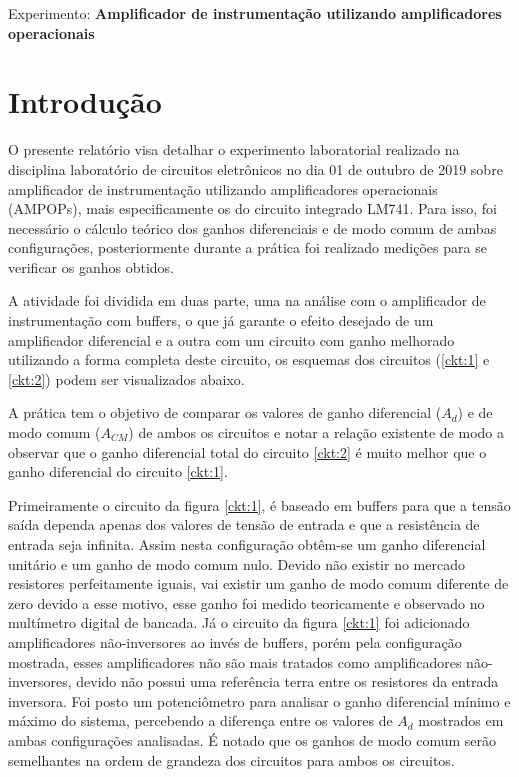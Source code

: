 \begin{center}
\large Experimento: \textbf{Amplificador de instrumentação utilizando amplificadores operacionais}
\end{center}

\setlength{\abovedisplayskip}{-10pt}
\setlength{\belowdisplayskip}{-10pt}

\section{Introdução}


O presente relatório visa detalhar o experimento laboratorial realizado na disciplina laboratório de circuitos eletrônicos no dia 01 de outubro de 2019 sobre amplificador de instrumentação utilizando amplificadores operacionais (AMPOPs), mais especificamente os do circuito integrado LM741. Para isso, foi necessário o cálculo teórico dos ganhos diferenciais e de modo comum de ambas configurações, posteriormente durante a prática foi realizado medições para se verificar os ganhos obtidos.

A atividade foi dividida em duas parte, uma na análise com o amplificador de instrumentação com buffers, o que já garante o efeito desejado de um amplificador diferencial e a outra com um circuito com ganho melhorado utilizando a forma completa deste circuito, os esquemas dos circuitos (\ref{ckt:1} e \ref{ckt:2}) podem ser visualizados abaixo.





A prática tem o objetivo de comparar os valores de ganho diferencial ($A_d$) e de modo comum ($A_{CM}$) de ambos os circuitos e notar a relação existente de modo a observar que o ganho diferencial total do circuito \ref{ckt:2} é muito melhor que o ganho diferencial do circuito \ref{ckt:1}.

Primeiramente o circuito da figura \ref{ckt:1}, é baseado em buffers para que a tensão saída dependa apenas dos valores de tensão de entrada e que a resistência de entrada seja infinita. Assim nesta configuração obtêm-se um ganho diferencial unitário e um ganho de modo comum nulo. Devido não existir no mercado resistores perfeitamente iguais, vai existir um ganho de modo comum diferente de zero devido a esse motivo, esse ganho foi medido teoricamente e observado no multímetro digital de bancada. Já o circuito da figura \ref{ckt:1} foi adicionado amplificadores não-inversores ao invés de buffers, porém pela configuração mostrada, esses amplificadores não são mais tratados como amplificadores não-inversores, devido não possui uma referência terra entre os resistores da entrada inversora. Foi posto um potenciômetro para analisar o ganho diferencial mínimo e máximo do sistema, percebendo a diferença entre os valores de $A_d$ mostrados em ambas configurações analisadas. É notado que os ganhos de modo comum serão semelhantes na ordem de grandeza dos circuitos para ambos os circuitos.       

